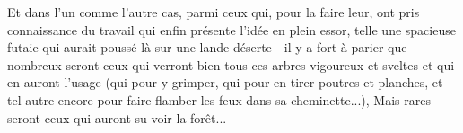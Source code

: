 Et dans l'un comme l'autre cas, parmi ceux qui, pour la faire leur, ont pris connaissance du travail qui enfin présente l'idée en plein essor, telle une spacieuse futaie qui aurait poussé là sur une lande déserte - il y a fort à parier que nombreux seront ceux qui verront bien tous ces arbres vigoureux et sveltes et qui en auront l'usage (qui pour y grimper, qui pour en tirer poutres et planches, et tel autre encore pour faire flamber les feux dans sa cheminette...), Mais rares seront ceux qui auront su voir la forêt...





